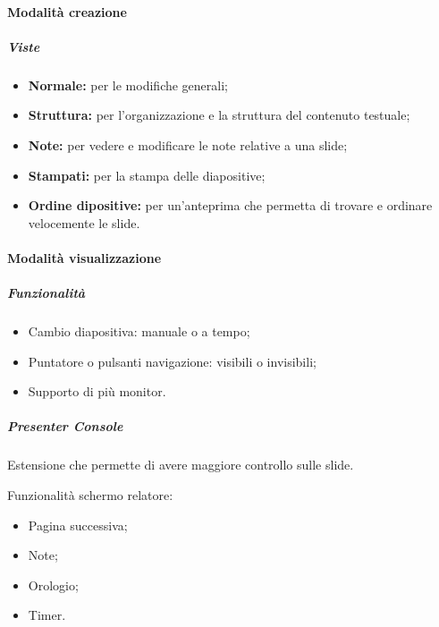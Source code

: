 \paragraph{Modalità creazione}
 \subparagraph{Viste}
 \begin{itemize}
 \item \textbf{Normale:} per le modifiche generali;
 \item \textbf{Struttura:} per l'organizzazione e la struttura del contenuto testuale;
 \item \textbf{Note:} per vedere e modificare le note relative a una slide;
 \item \textbf{Stampati:} per la stampa delle diapositive;
 \item \textbf{Ordine dipositive:} per un'anteprima che permetta di trovare e ordinare velocemente le slide.
 \end{itemize}
\paragraph{Modalità visualizzazione}
\subparagraph{Funzionalità}
 \begin{itemize}
  \item Cambio diapositiva: manuale o a tempo;
  \item Puntatore o pulsanti navigazione: visibili o invisibili;
  \item Supporto di più monitor.
 \end{itemize}
\subparagraph{Presenter Console}
Estensione che permette di avere maggiore controllo sulle slide.

Funzionalità schermo relatore:
\begin{itemize}
  \item Pagina successiva;
  \item Note;
  \item Orologio;
  \item Timer.
\end{itemize}
